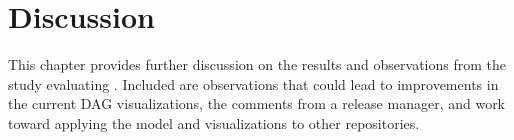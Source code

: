 \chapter{Discussion}\label{cha:discussion}

This chapter provides further discussion on the results and observations
from the study evaluating \tool{}. Included are observations that could
lead to improvements in the current DAG visualizations, the comments
from a release manager, and work toward applying the \mt{} model and
visualizations to other repositories.
